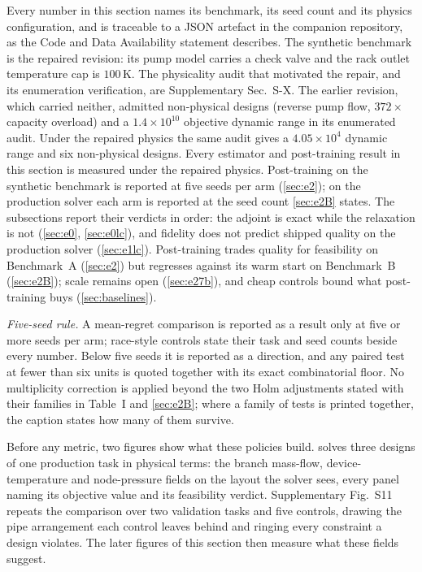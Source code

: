 \documentclass[journal]{IEEEtran}
\begin{document}
Every number in this section names its benchmark, its seed count and its physics
configuration, and is traceable to a JSON artefact in the companion repository, as
the Code and Data Availability statement describes.  The synthetic benchmark is the
repaired revision: its pump model carries a check valve and the rack outlet
temperature cap is $100$\,K.  The physicality audit that motivated the repair,
and its enumeration verification, are Supplementary Sec.~S-X.  The earlier revision, which carried neither, admitted non-physical designs
(reverse pump flow, $372\times$ capacity overload) and a $1.4\times10^{10}$
objective dynamic range in its enumerated audit.  Under the repaired physics the
same audit gives a $4.05\times10^{4}$ dynamic range and six non-physical designs.  Every estimator and post-training result
in this section is measured under the repaired physics.  Post-training on the
synthetic benchmark is reported at five seeds per arm (\cref{sec:e2}); on the
production solver each arm is reported at the seed count \cref{sec:e2B} states.
The subsections report their verdicts in order: the adjoint is exact while the relaxation is not
(\cref{sec:e0}, \cref{sec:e0lc}), and fidelity does not predict shipped
quality on the production solver (\cref{sec:e1lc}).  Post-training trades quality
for feasibility on Benchmark~A (\cref{sec:e2}) but regresses against its warm start
on Benchmark~B (\cref{sec:e2B}); scale remains open (\cref{sec:e27b}), and cheap
controls bound what post-training buys (\cref{sec:baselines}).

\emph{Five-seed rule.}  A mean-regret comparison is reported as a result only at
five or more seeds per arm; race-style controls state their task and seed counts
beside every number.  Below five seeds it is reported as a direction, and any
paired test at fewer than six units is quoted together with its exact combinatorial
floor.  No multiplicity correction is applied beyond the two Holm adjustments stated with
their families in Table~I and \cref{sec:e2B}; where a family of tests is printed
together, the caption states how many of them survive.

Before any metric, two figures show what these policies build.  
solves three designs of one production task in physical terms: the branch
mass-flow, device-temperature and node-pressure fields on the layout the solver
sees, every panel naming its objective value and its feasibility verdict.
Supplementary Fig.~S11 repeats the comparison over two validation tasks and five
controls, drawing the pipe arrangement each control leaves behind and ringing
every constraint a design violates.  The later figures of this section then
measure what these fields suggest.
\end{document}
